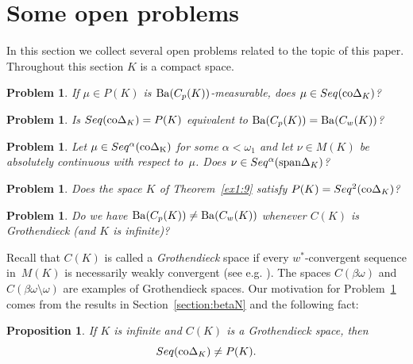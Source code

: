 \documentclass[12pt]{amsart}
\newcommand{\sm}{\setminus}
\newcommand{\Ba}{{\rm Ba}}
\newcommand{\lin}{\protect{\rm span}}
\newcommand{\0}{\protect{\bf 0}}
\newcommand{\1}{\protect{\bf 1}}
\newtheorem{prop}[theo]{Proposition}%
\newtheorem{problem}[theo]{Problem}
\theoremstyle{definition}
\theoremstyle{remark}
\numberwithin{equation}{section}
\begin{document}
\section{Some open problems}

In this section we collect several open problems related to the topic of this paper.
Throughout this section $K$ is a compact space.

\begin{problem}
If $\mu\in P(K)$ is $\Ba(C_p(K))$-measurable, does $\mu\in Seq({\rm co}\Delta_K)$?
\end{problem}

\begin{problem}
Is $Seq({\rm co}\Delta_K) = P(K)$ equivalent to $\Ba(C_p(K)) = \Ba(C_w(K))$?
\end{problem}

\begin{problem}
Let $\mu\in Seq^{\alpha}({\rm co \Delta_K})$ for some $\alpha<\omega_1$
and let $\nu\in M(K)$ be absolutely continuous with respect to~$\mu$. Does $\nu\in Seq^{\alpha}(\lin\Delta_K)$?
\end{problem}

\begin{problem}
Does the space $K$ of Theorem~\ref{ex1:9} satisfy $P(K)=Seq^2({\rm co}\Delta_K)$?
\end{problem}

\begin{problem}\label{problem:G}
Do we have $\Ba(C_p(K))\neq \Ba(C_w(K))$ 
whenever $C(K)$ is Grothendieck (and $K$ is infinite)?
\end{problem}

Recall that $C(K)$ is called a {\em Grothendieck} space if every
$w^*$-convergent sequence in~$M(K)$ is necessarily weakly convergent (see e.g. \cite[p.~179]{die-uhl-J}). 
The spaces $C(\beta\omega)$ and $C(\beta\omega \sm \omega)$ are examples of Grothendieck spaces. 
Our motivation for Problem~\ref{problem:G} comes from the results in Section~\ref{section:betaN}
and the following fact:

\begin{prop}\label{Grothendiecknosequential}
If $K$ is infinite and $C(K)$ is a Grothendieck space, then
$$
	Seq({\rm co}\Delta_K) \neq P(K).
$$
\end{prop}
\end{document}
